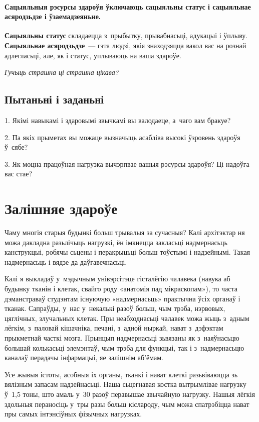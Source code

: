 \paragraph{Сацыяльныя рэсурсы здароўя ўключаюць сацыяльны статус і сацыяльнае асяродзьдзе і ўзаемадзеяньне.} \textbf{Сацыяльны статус} складаецца з~прыбытку, прывабнасьці, адукацыі і ўплыву. \textbf{Сацыяльнае асяродзьдзе}~--- гэта людзі, якія знаходзяцца вакол вас на рознай адлегласьці, але, як і статус, уплываюць на ваша здароўе. 

\emph{Гучыць страшна ці страшна цікава?}


\subsection*{Пытаньні і заданьні}

1. Якімі навыкамі і здаровымі звычкамі вы валодаеце, а~чаго вам бракуе?

2. Па якіх прыметах вы можаце вызначыць асабліва высокі ўзровень здароўя ў~сябе?

3. Як моцна працоўная нагрузка вычэрпвае вашыя рэсурсы здароўя? Ці надоўга вас стае?


\section{Залішняе здароўе}


Чаму многія старыя будынкі больш трывалыя за сучасныя? Калі архітэктар ня можа дакладна разьлічыць нагрузкі, ён імкнецца закласьці надмернасьць канструкцыі, робячы сьцены і перакрыцьці больш тоўстымі і надзейнымі. Такая надмернасьць і вядзе да даўгавечнасьці.

Калі я выкладаў у~мэдычным унівэрсітэце гісталёгію чалавека (навука аб будынку тканін і клетак, свайго роду «анатомія пад мікраскопам»), то часта дэманстраваў студэнтам існуючую «надмернасьць» практычна ўсіх органаў і тканак. Сапраўды, у~нас у~некалькі разоў больш, чым трэба, нэрвовых, цяглічных, злучальных клетак. Пры неабходнасьці чалавек можа жыць з~адным лёгкім, з~паловай кішачніка, печані, з~адной ныркай, нават з~дэфэктам прыкметнай часткі мозга. Прынцып надмернасьці зьвязаны як з~наяўнасьцю большай колькасьці элемэнтаў, чым трэба для функцыі, так і з~надмернасьцю каналаў перадачы інфармацыі, яе залішнім аб'ёмам.

Усе жывыя істоты, асобныя іх органы, тканкі і нават клеткі разьвіваюцца зь вялізным запасам надзейнасьці. Наша сьцегнавая костка вытрымлівае нагрузку ў~1,5 тоны, што амаль у~30 разоў перавышае звычайную нагрузку. Нашыя лёгкія здольныя пераносіць у~тры разы больш кіслароду, чым можа спатрэбіцца нават пры самых інтэнсіўных фізычных нагрузках.

